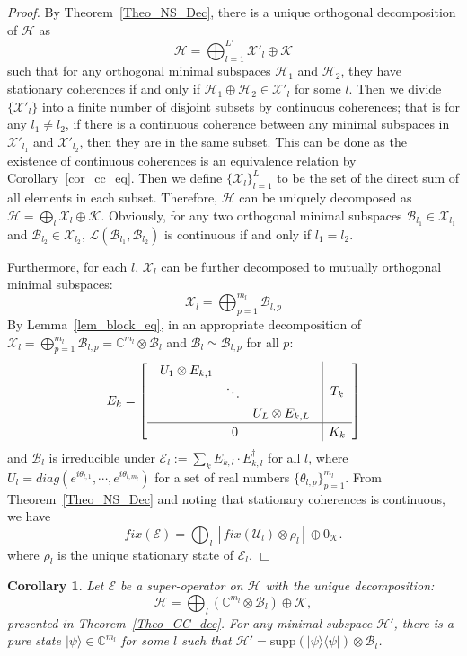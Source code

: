 \documentclass[journal]{IEEEtran}
\def\h{\ensuremath{\mathcal{H}}}
\def\l{\ensuremath{\mathcal{L}}}
\def\u{\ensuremath{\mathcal{U}}}
\def\k{\ensuremath{\mathcal{K}}}
\def\u{\ensuremath{\mathcal{U}}}
\def\x{\ensuremath{\mathcal{X}}}
\def\b{\ensuremath{\mathcal{B}}}
\def\e{\ensuremath{\mathcal{E}}}
\def\l{\ensuremath{\mathcal{L}}}
\def\l{\mathcal{L}}
\def\k{\mathcal{K}}
\newtheorem{corollary}{Corollary}
\begin{document}
{\it Proof.} By Theorem~\ref{Theo_NS_Dec}, there is a unique  orthogonal decomposition of $\h$ as
  $$\h=\bigoplus_{l=1}^{L'}\x'_l\oplus \k$$
such that for any orthogonal minimal subspaces $\h_1$ and $\h_2$, they have stationary coherences if and only if $\h_{1}\oplus \h_2\in \x'_l$ for some $l$.
      Then we divide $\{\x'_l\}$ into a finite number of disjoint subsets by continuous coherences; that  is for any $l_1\not =l_2$, if there is a continuous coherence between any minimal subspaces in $\x'_{l_1}$ and $\x'_{l_2}$, then they are in the same subset. This can be done as the existence of continuous coherences is an equivalence relation by Corollary~\ref{cor_cc_eq}. Then we define $\{\x_l\}_{l=1}^{L}$ to be the set of the direct sum  of all elements in each subset.  Therefore, $\h$ can be uniquely decomposed as $\h=\bigoplus_l\x_l\oplus \k.$ Obviously, for any two orthogonal  minimal subspaces $\b_{l_1}\in\x_{l_1}$ and $\b_{l_2}\in\x_{l_2}$, $\l(\b_{l_1},\b_{l_2})$ is continuous if and only if $l_1=l_2$.

Furthermore, for each $l$, $\x_l$ can be further decomposed to mutually orthogonal minimal subspaces:
$$\x_l=\bigoplus_{p=1}^{m_l}\b_{l,p}$$
By Lemma~\ref{lem_block_eq}, %
in  an appropriate decomposition  of $\x_l=\bigoplus_{p=1}^{m_l}\b_{l,p}=\mathbb{C}^{m_l}\otimes \b_l$ and $\b_l\simeq \b_{l,p}$ for all $p$:
\begin{eqnarray}
    \renewcommand{\arraystretch}{1.2}
E_k=\left[\begin{array}{c|c}
  \begin{array}{ccc}
  U_{1}\otimes E_{k,1} &  &\\
   & \ddots &\\
   & & U_{L}\otimes E_{k,L}  
  \end{array} & T_k\\
  \hline
0&K_k
\end{array}\right]
  \end{eqnarray}
and $\b_l$ is irreducible under $\e_{l}:=\sum_{k}E_{k,l}\cdot E_{k,l}^\dagger$  for all $l$, 
where $U_l=diag(e^{i\theta_{l,1}},\cdots,e^{i\theta_{l,m_l}})$ for a set of real numbers $\{\theta_{l,p}\}_{p=1}^{m_l}.$  From Theorem~\ref{Theo_NS_Dec} and noting that stationary coherences is continuous, we have
$$fix(\e)=\bigoplus_l[fix(\u_{l})\otimes \rho_l]\oplus 0_\k.$$ 
where $\rho_l$ is the unique stationary state of $\e_l.$ \hfill $\Box$
\begin{corollary}\label{Cor_mini}
  Let $\e$ be a super-operator  on $\h$ with the unique decomposition:
$$\h=\bigoplus_l(\mathbb{C}^{m_l}\otimes \b_l)\oplus \k,$$
presented in Theorem~\ref{Theo_CC_dec}. For any minimal subspace $\h'$, there is a pure state $|\psi\rangle\in \mathbb{C}^{m_l}$ for some $l$ such that $\h'=\textrm{supp}(|\psi\rangle\langle \psi|)\otimes \b_l$. 
\end{corollary}
\end{document}
